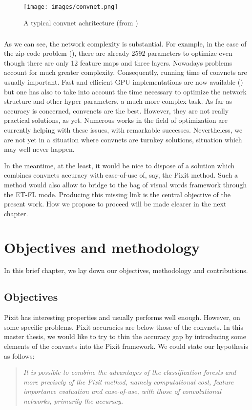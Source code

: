 \documentclass[a4paper]{report}
\begin{document}
\begin{figure}
	\centering
		\texttt{[image: images/convnet.png]}
	\caption{\label{fig:convnet}A typical convnet achritecture (from \cite{convnetImg})}
\end{figure}


\paragraph{}
As we can see, the network complexity is substantial. For example, in the case of the zip code problem (\cite{ConvNet}), there are already 2592 parameters to optimize even though there are only 12 feature maps and three layers. Nowadays problems account for much greater complexity. Consequently, running time of convnets are usually important. Fast and efficient GPU implementations are now available (\cite{GPUConvnet}) but one has also to take into account the time necessary to optimize the network structure and other hyper-parameters, a much more complex task. As far as accuracy is concerned, convenets are the best. However, they are not really practical solutions, as yet. Numerous works in the field of optimization are currently helping with these issues, with remarkable successes. Nevertheless, we are not yet in a situation where convnets are turnkey solutions, situation which may well never happen. 
\par
In the meantime, at the least, it would be nice to dispose of a solution which combines convnets accuracy with ease-of-use of, say, the Pixit method. Such a method would also allow to bridge to the bag of visual words framework through the ET-FL mode. Producing this missing link is the central objective of the present work. How we propose to proceed will be made clearer in the next chapter.


\chapter{\label{chap:objectives}Objectives and methodology}
In this brief chapter, we lay down our objectives, methodology and contributions.

\section{Objectives}
Pixit has interesting properties and usually performs well enough. However, on some specific problems, Pixit accuracies are below those of the convnets. In this master thesis, we would like to try to thin the accuracy gap by introducing some elements of the convnets into the Pixit framework. We could state our hypothesis as follows:
\begin{quote}
\itshape
It is possible to combine the advantages of the classification forests and more precisely of the Pixit method, namely computational cost, feature importance evaluation and ease-of-use, with those of convolutional networks, primarily the accuracy.
\end{quote}
\end{document}
